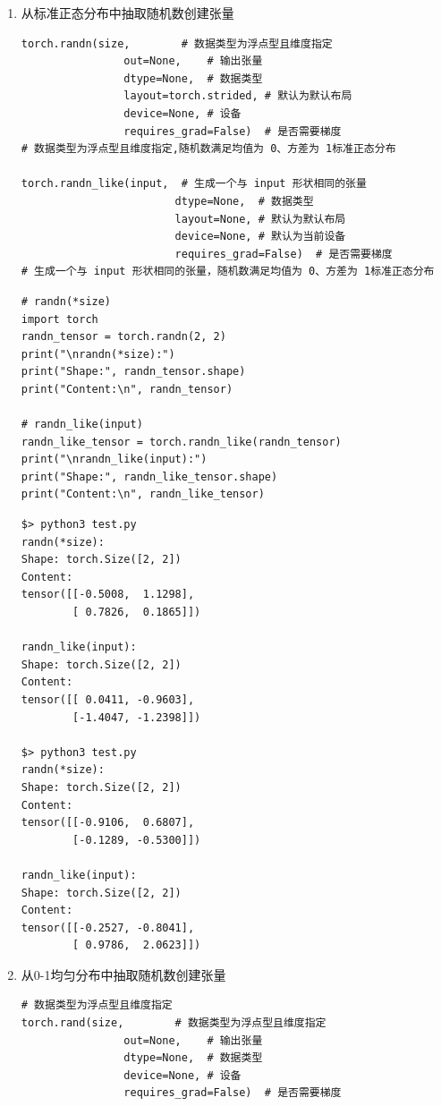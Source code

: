 \begin{enumerate}[label=\arabic*)]
\item 从标准正态分布中抽取随机数创建张量
\begin{lstlisting}[style=demostyle,numbers=none]
torch.randn(size,        # 数据类型为浮点型且维度指定
                out=None,    # 输出张量
                dtype=None,  # 数据类型
                layout=torch.strided, # 默认为默认布局
                device=None, # 设备
                requires_grad=False)  # 是否需要梯度
# 数据类型为浮点型且维度指定,随机数满足均值为 0、方差为 1标准正态分布

torch.randn_like(input,  # 生成一个与 input 形状相同的张量
                        dtype=None,  # 数据类型
                        layout=None, # 默认为默认布局
                        device=None, # 默认为当前设备
                        requires_grad=False)  # 是否需要梯度
# 生成一个与 input 形状相同的张量，随机数满足均值为 0、方差为 1标准正态分布
\end{lstlisting}
\begin{lstlisting}[style=pythonstyle]
# randn(*size)
import torch
randn_tensor = torch.randn(2, 2)
print("\nrandn(*size):")
print("Shape:", randn_tensor.shape)
print("Content:\n", randn_tensor)

# randn_like(input)
randn_like_tensor = torch.randn_like(randn_tensor)
print("\nrandn_like(input):")
print("Shape:", randn_like_tensor.shape)
print("Content:\n", randn_like_tensor)
\end{lstlisting}
\begin{lstlisting}[style=demostyle,numbers=none]
$> python3 test.py
randn(*size):
Shape: torch.Size([2, 2])
Content:
tensor([[-0.5008,  1.1298],
        [ 0.7826,  0.1865]])

randn_like(input):
Shape: torch.Size([2, 2])
Content:
tensor([[ 0.0411, -0.9603],
        [-1.4047, -1.2398]])

$> python3 test.py
randn(*size):
Shape: torch.Size([2, 2])
Content:
tensor([[-0.9106,  0.6807],
        [-0.1289, -0.5300]])

randn_like(input):
Shape: torch.Size([2, 2])
Content:
tensor([[-0.2527, -0.8041],
        [ 0.9786,  2.0623]])
\end{lstlisting}

\item 从0-1均匀分布中抽取随机数创建张量
\begin{lstlisting}[style=demostyle,numbers=none]
# 数据类型为浮点型且维度指定
torch.rand(size,        # 数据类型为浮点型且维度指定
                out=None,    # 输出张量
                dtype=None,  # 数据类型
                device=None, # 设备
                requires_grad=False)  # 是否需要梯度


\end{lstlisting}
\end{enumerate}

